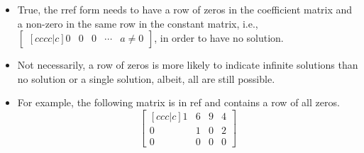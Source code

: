 \documentclass[basic]{inVerba-notes}
\begin{document}
\begin{enumerate}
\begin{enumerate}
\begin{itemize}
    \end{itemize}
      \begin{itemize}
        \item True, the rref form needs to have a row of zeros in the coefficient matrix and a non-zero in the same row in the constant matrix, i.e., \(\begin{bmatrix}[cccc|c] 0 & 0 & 0 &\cdots & a \neq 0 \end{bmatrix}\), in order to have no solution. 
      \end{itemize}
    \begin{itemize}
      \item Not necessarily, a row of zeros is more likely to indicate infinite solutions than no solution or a single solution, albeit, all are still possible. 
      \item For example, the following matrix is in ref and contains a row of all zeros.
      \[%
      \begin{bmatrix}[ccc|c]
        1 & 6 & 9 & 4 \\
        0 & 1 & 0 & 2 \\
        0 & 0 & 0 & 0
      \end{bmatrix}
      \]%
    \end{itemize}
\end{enumerate}

\minor{\item 

}
\end{enumerate}
\end{document}
